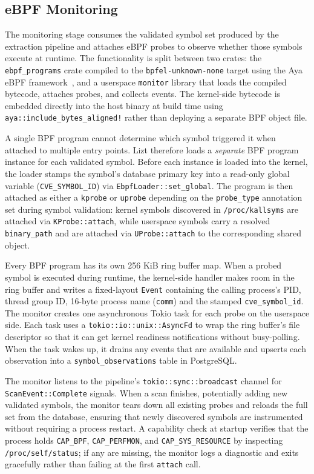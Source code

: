\documentclass[conference]{IEEEtran}
\begin{document}
\subsection{eBPF Monitoring}
The monitoring stage consumes the validated symbol set produced by the extraction pipeline and attaches eBPF probes to observe whether those symbols execute at runtime.
The functionality is split between two crates: the \texttt{ebpf\_programs} crate compiled to the \texttt{bpfel-unknown-none} target using the Aya eBPF framework~\cite{aya}, and a userspace \texttt{monitor} library that loads the compiled bytecode, attaches probes, and collects events.
The kernel-side bytecode is embedded directly into the host binary at build time using \texttt{aya::include\_bytes\_aligned!} rather than deploying a separate BPF object file.

A single BPF program cannot determine which symbol triggered it when attached to multiple entry points.
Lizt therefore loads a \emph{separate} BPF program instance for each validated symbol.
Before each instance is loaded into the kernel, the loader stamps the symbol's database primary key into a read-only global variable (\texttt{CVE\_SYMBOL\_ID}) via \texttt{EbpfLoader::set\_global}.
The program is then attached as either a \texttt{kprobe} or \texttt{uprobe} depending on the \texttt{probe\_type} annotation set during symbol validation: kernel symbols discovered in \texttt{/proc/kallsyms} are attached via \texttt{KProbe::attach}, while userspace symbols carry a resolved \texttt{binary\_path} and are attached via \texttt{UProbe::attach} to the corresponding shared object.

Every BPF program has its own 256 KiB ring buffer map.
When a probed symbol is executed during runtime, the kernel-side handler makes room in the ring buffer and writes a fixed-layout \texttt{Event} containing the calling process's PID, thread group ID, 16-byte process name (\texttt{comm}) and the stamped \texttt{cve\_symbol\_id}.
The monitor creates one asynchronous Tokio task for each probe on the userspace side.
Each task uses a \texttt{tokio::io::unix::AsyncFd} to wrap the ring buffer's file descriptor so that it can get kernel readiness notifications without busy-polling.
When the task wakes up, it drains any events that are available and upserts each observation into a \texttt{symbol\_observations} table in PostgreSQL.

The monitor listens to the pipeline's \texttt{tokio::sync::broadcast} channel for \texttt{ScanEvent::Complete} signals.
When a scan finishes, potentially adding new validated symbols, the monitor tears down all existing probes and reloads the full set from the database, ensuring that newly discovered symbols are instrumented without requiring a process restart.
A capability check at startup verifies that the process holds \texttt{CAP\_BPF}, \texttt{CAP\_PERFMON}, and \texttt{CAP\_SYS\_RESOURCE} by inspecting \texttt{/proc/self/status}; if any are missing, the monitor logs a diagnostic and exits gracefully rather than failing at the first \texttt{attach} call.
\end{document}
